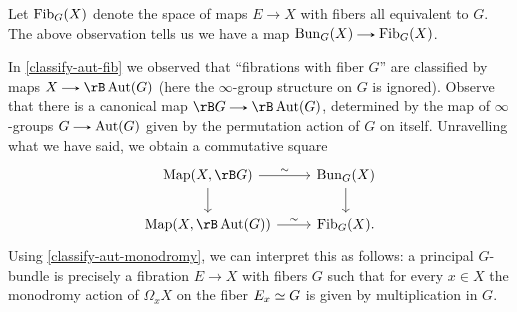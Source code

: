 \begin{nothing}
\begin{subremark}
    Let $\operatorname{Fib}_G(X)$ denote the space of maps $E \to X$ with fibers all equivalent to $G$. The above observation tells us we have a map $\Bun_G(X) \to \Fib_G(X)$.

    In \cref{classify-aut-fib} we observed that ``fibrations with fiber $G$'' are classified by maps $X \to \rB \Aut(G)$ (here the $\infty$-group structure on $G$ is ignored). Observe that there is a canonical map $\rB G \to \rB \Aut(G)$, determined by the map of $\infty$-groups $G \to \Aut(G)$ given by the permutation action of $G$ on itself. Unravelling what we have said, we obtain a commutative square
    \[
      \begin{tikzcd}
        \Map(X,\rB G) \ar[r, "\sim"] \ar[d] &
        \Bun_G(X) \ar[d] \\
        \Map(X,\rB \Aut(G)) \ar[r, "\sim"] &
        \Fib_G(X).
      \end{tikzcd}
    \]
    Using \cref{classify-aut-monodromy}, we can interpret this as follows: a principal $G$-bundle is precisely a fibration $E \to X$ with fibers $G$ such that for every $x \in X$ the monodromy action of $\Omega_x X$ on the fiber $E_x \simeq G$ is given by multiplication in $G$.
  \end{subremark}
\end{nothing}

